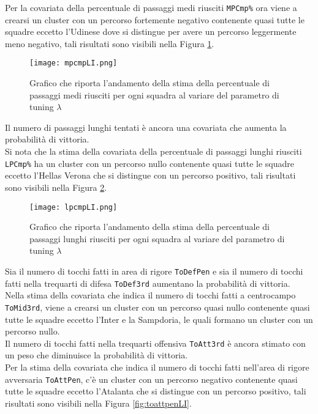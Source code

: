 Per la covariata della percentuale di passaggi medi riusciti \texttt{MPCmp\%} ora viene a crearsi un cluster con un percorso fortemente negativo contenente quasi tutte le squadre eccetto l'Udinese dove si distingue per avere un percorso leggermente meno negativo, tali risultati sono visibili nella Figura \ref{fig:mpcmpLI}.\\
\begin{figure}[]
	\begin{center}
		\texttt{[image: mpcmpLI.png]}
		\caption{Grafico che riporta l'andamento della stima della percentuale di passaggi medi riusciti per ogni squadra al variare del parametro di tuning $\lambda$} \label{fig:mpcmpLI}
	\end{center}
\end{figure}
Il numero di passaggi lunghi tentati è ancora una covariata che aumenta la probabilità di vittoria.\\
Si nota che la stima della covariata della percentuale di passaggi lunghi riusciti \texttt{LPCmp\%} ha un cluster con un percorso nullo contenente quasi tutte le squadre eccetto l'Hellas Verona che si distingue con un percorso positivo, tali risultati sono visibili nella Figura \ref{fig:lpcmpLI}.\\
\begin{figure}[htbp]
	\begin{center}
		\texttt{[image: lpcmpLI.png]}
		\caption{Grafico che riporta l'andamento della stima della percentuale di passaggi lunghi riusciti per ogni squadra al variare del parametro di tuning $\lambda$} \label{fig:lpcmpLI}
	\end{center}
\end{figure}
Sia il numero di tocchi fatti in area di rigore \texttt{ToDefPen} e sia il numero di tocchi fatti nella trequarti di difesa \texttt{ToDef3rd} aumentano la probabilità di vittoria.\\
Nella stima della covariata che indica il numero di tocchi fatti a centrocampo \texttt{ToMid3rd}, viene a crearsi un cluster con un percorso quasi nullo contenente quasi tutte le squadre eccetto l'Inter e la Sampdoria, le quali formano un cluster con un percorso nullo.\\
Il numero di tocchi fatti nella trequarti offensiva \texttt{ToAtt3rd} è ancora stimato con un peso che diminuisce la probabilità di vittoria.\\
Per la stima della covariata che indica il numero di tocchi fatti nell'area di rigore avversaria \texttt{ToAttPen}, c'è un cluster con un percorso negativo contenente quasi tutte le squadre eccetto l'Atalanta che si distingue con un percorso positivo, tali risultati sono visibili nella Figura \ref{fig:toattpenLI}.\\
